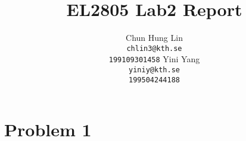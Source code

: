 \documentclass{article}
\title{EL2805 Lab2 Report}
\author{
  Chun Hung Lin \\
  \texttt{chlin3@kth.se} \\
  \texttt{199109301458}
  \And
  Yini Yang \\
  \texttt{yiniy@kth.se} \\
  \texttt{199504244188}
}
\begin{document}
\maketitle

\section{Problem 1}
\end{document}
